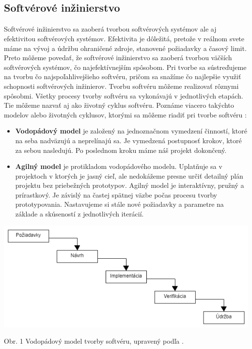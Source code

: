 \documentclass[10pt,twoside,slovak,a4paper]{article}
\begin{document}
\subsection{Softvérové inžinierstvo} \label{SWE}
\paragraph{}
 Softvérové inžinierstvo \cite{swemb} sa zaoberá tvorbou softvérových systémov ale aj efektivitou softvérových systémov. Efektivita je dôležitá, pretože v reálnom svete máme na vývoj a údržbu ohraničené zdroje, stanovené požiadavky a časový limit. Preto môžeme povedať, že softvérové inžinierstvo sa zaoberá tvorbou väčších softvérových systémov, čo najefektívnejším spôsobom. Pri tvorbe sa sústreďujeme na tvorbu čo najspoľahlivejšieho softvéru, pričom sa snažíme čo najlepšie využiť schopnosti softvérových inžinierov.
Tvorbu softvéru môžeme realizovať rôznymi spôsobmi. Všetky procesy tvorby softvéru sa vykonávajú v jednotlivých etapách. Tie môžeme nazvať aj ako životný cyklus softvéru. Poznáme viacero takýchto modelov alebo životných cyklusov, ktorými sa môžeme riadiť pri tvorbe softvéru \cite{swebp}:
\begin{itemize}
    \item \textbf{Vodopádový model} je založený na jednoznačnom vymedzení činností, ktoré na seba nadväzujú a neprelínajú sa. Je vymedzená postupnosť krokov, ktoré  za sebou nasledujú. Po poslednom kroku máme náš projekt dokončený.
    \item \textbf{Agilný model} je protikladom vodopádového modelu. Uplatňuje sa v projektoch v ktorých je jasný cieľ, ale nedokážeme presne určiť detailný plán projektu bez priebežných prototypov. Agilný model je interaktívny, pružný a prírastkový. Je závislý na častej spätnej väzbe počas procesu tvorby  prototypovania. Nastavujeme si stále nové požiadavky a parametre na základe a skúseností z jednotlivých iterácií. 
\end{itemize}
\begin{center}
\includegraphics[scale=0.4]{vodopad1}
\end{center}
\begin{center}
Obr. 1 Vodopádový model tvorby softvéru, upravený podľa \cite{swebp}.
\end{center}
\end{document}
